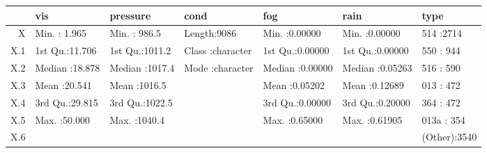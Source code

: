 \begin{table}[ht]
\centering
\begin{tabular}{rllllll}
  \hline
 &      vis &    pressure &     cond &      fog &      rain &      type \\ 
  \hline
X & Min.   : 1.965   & Min.   : 986.5   & Length:9086        & Min.   :0.00000   & Min.   :0.00000   & 514    :2714   \\ 
  X.1 & 1st Qu.:11.706   & 1st Qu.:1011.2   & Class :character   & 1st Qu.:0.00000   & 1st Qu.:0.00000   & 550    : 944   \\ 
  X.2 & Median :18.878   & Median :1017.4   & Mode  :character   & Median :0.00000   & Median :0.05263   & 516    : 590   \\ 
  X.3 & Mean   :20.541   & Mean   :1016.5   &  & Mean   :0.05202   & Mean   :0.12689   & 013    : 472   \\ 
  X.4 & 3rd Qu.:29.815   & 3rd Qu.:1022.5   &  & 3rd Qu.:0.00000   & 3rd Qu.:0.20000   & 364    : 472   \\ 
  X.5 & Max.   :50.000   & Max.   :1040.4   &  & Max.   :0.65000   & Max.   :0.61905   & 013a   : 354   \\ 
  X.6 &  &  &  &  &  & (Other):3540   \\ 
   \hline
\end{tabular}
\end{table}
